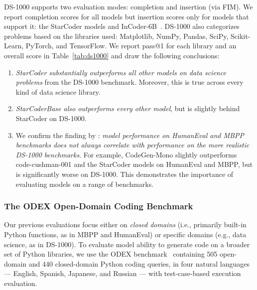 \documentclass[10pt]{article} %
\begin{document}
DS-1000 supports two evaluation modes: completion and insertion (via FIM). We report completion scores for all models but insertion scores only for models that support it: the StarCoder models and InCoder-6B~\citep{fried2022incoder}.
DS-1000 also categorizes problems based on the libraries used: Matplotlib, NumPy, Pandas, SciPy, Scikit-Learn, PyTorch, and TensorFlow.  We report pass@1 for each library and an overall score in
Table~\ref{tab:ds1000} and draw the following conclusions:

\begin{enumerate}

  \item \emph{StarCoder substantially outperforms all other models on data science problems} from the DS-1000 benchmark. Moreover, this is true across every kind of data science library.

  \item \emph{StarCoderBase also outperforms every other model}, but is slightly behind StarCoder on DS-1000.

  \item We confirm the finding by \citet{Lai2022DS1000}: \emph{model performance on HumanEval and MBPP benchmarks does not always correlate with performance on the more realistic DS-1000 benchmarks}. For example, CodeGen-Mono slightly outperforms code-cushman-001 and the StarCoder models on HumanEval and MBPP, but is significantly worse on DS-1000. This demonstrates the importance of evaluating models on a range of benchmarks.

\end{enumerate}



\subsubsection{The ODEX Open-Domain Coding Benchmark}
Our previous evaluations focus either on \emph{closed domains} (i.e., primarily built-in Python functions, as in MBPP and HumanEval) or specific domains (e.g., data science, as in DS-1000). To evaluate model ability to generate code on a broader set of Python libraries, we use the ODEX benchmark~\citep{wang2022execution} containing 505 open-domain and 440 closed-domain Python coding queries, in four natural languages --- English, Spanish, Japanese, and Russian --- with test-case-based execution evaluation.
\end{document}
